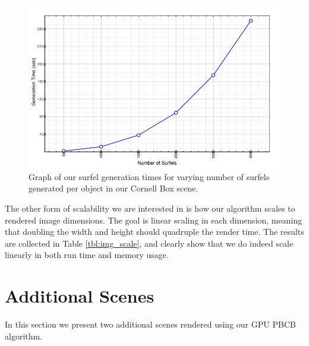 \begin{figure}[h!]
    \centering
    \includegraphics[width=150mm]{../img/surfel_gen_graph.png}
    \caption[Surfel Generation Time Graph]{Graph of our surfel generation times for varying number of surfels generated per object in our Cornell Box scene.}
    \label{fig:surfel_gen_times_graph}
\end{figure}

The other form of scalability we are interested in is how our algorithm scales to rendered image dimensions. The goal is linear scaling in each dimension, meaning that doubling the width and height should quadruple the render time. The results are collected in Table \ref{tbl:img_scale}, and clearly show that we do indeed scale linearly in both run time and memory usage.

\clearpage
\section{Additional Scenes}

In this section we present two additional scenes rendered using our GPU PBCB algorithm.%

